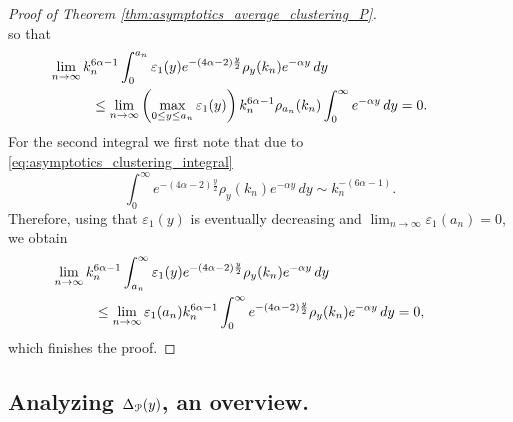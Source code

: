 \begin{proof}[Proof of Theorem \ref{thm:asymptotics_average_clustering_P}]
\[\]
so that
\begin{align*}
	&\hspace{-30pt}\lim_{n \to \infty} k_n^{6\alpha - 1} \int_0^{a_n} \varepsilon_1(y) e^{-(4\alpha - 2)\frac{y}{2}} 
    	\rho_{y}(k_n) e^{-\alpha y} \, dy\\
	&\le \lim_{n \to \infty} \left(\max_{0 \le y \le a_n} \varepsilon_1(y)\right) k_n^{6\alpha - 1} 
    	\rho_{a_n}(k_n) \int_0^\infty e^{-\alpha y} \, dy = 0.
\end{align*}
For the second integral we first note that due to \eqref{eq:asymptotics_clustering_integral}
\[
	\int_0^\infty e^{-(4\alpha - 2)\frac{y}{2}} \rho_{y}(k_n) e^{-\alpha y} \, dy \sim k_n^{-(6\alpha - 1)}.
\] 
Therefore, using that $\varepsilon_1(y)$ is eventually decreasing and $\lim_{n \to \infty} \varepsilon_1(a_n) = 0$, we obtain
\begin{align*}
	&\hspace{-30pt}\lim_{n \to \infty} k_n^{6\alpha - 1} \int_{a_n}^{\infty} \varepsilon_1(y) 
    	e^{-(4\alpha - 2)\frac{y}{2}} \rho_{y}(k_n) e^{-\alpha y} \, dy\\
	&\le \lim_{n \to \infty} \varepsilon_1(a_n) k_n^{6\alpha - 1} \int_0^\infty 
    	e^{-(4\alpha - 2)\frac{y}{2}} \rho_{y}(k_n) e^{-\alpha y} \, dy = 0,
\end{align*}
which finishes the proof.
\end{proof}

\subsection{Analyzing $\Delta_{{\mathcal P}}(y)$, an overview.}\label{ssec:asymptotics_Delta_y_P}

